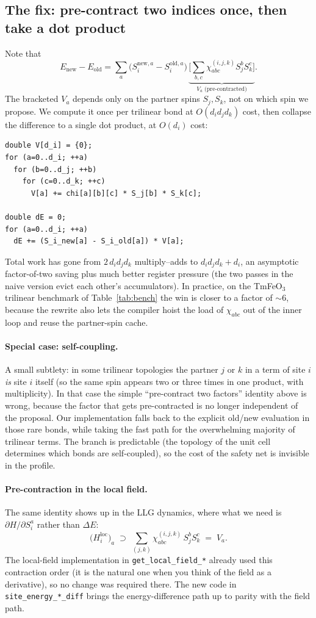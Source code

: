\documentclass[11pt,letterpaper]{article}
\begin{document}
\subsection{The fix: pre-contract two indices once, then take a dot product}
Note that
\[
   E_{\text{new}} - E_{\text{old}}
   = \sum_{a} \big(S_i^{\text{new}, a} - S_i^{\text{old}, a}\big) \,
     \underbrace{\Big[\sum_{b,c} \chi^{(i,j,k)}_{abc} S_j^{b} S_k^{c}\Big]}_{V_{a}\;\text{(pre-contracted)}} .
\]
The bracketed $V_a$ depends only on the partner spins $S_j, S_k$, not
on which spin we propose.  We compute it once per trilinear bond at
$O(d_i d_j d_k)$ cost, then collapse the difference to a single dot
product, at $O(d_i)$ cost:
\begin{lstlisting}
double V[d_i] = {0};
for (a=0..d_i; ++a)
  for (b=0..d_j; ++b)
    for (c=0..d_k; ++c)
      V[a] += chi[a][b][c] * S_j[b] * S_k[c];

double dE = 0;
for (a=0..d_i; ++a)
  dE += (S_i_new[a] - S_i_old[a]) * V[a];
\end{lstlisting}
Total work has gone from $2\,d_i d_j d_k$ multiply--adds to
$d_i d_j d_k + d_i$, an asymptotic factor-of-two saving plus much
better register pressure (the two passes in the naive version evict
each other's accumulators).  In practice, on the TmFeO$_3$ trilinear
benchmark of Table~\ref{tab:bench} the win is closer to a
factor of $\sim 6$, because the rewrite also lets the compiler hoist
the load of $\chi_{abc}$ out of the inner loop and reuse the
partner-spin cache.

\paragraph{Special case: self-coupling.}  A small subtlety: in some
trilinear topologies the partner $j$ or $k$ in a term of site $i$
\emph{is} site $i$ itself (so the same spin appears two or three times
in one product, with multiplicity).  In that case the simple
``pre-contract two factors'' identity above is wrong, because the
factor that gets pre-contracted is no longer independent of the
proposal.  Our implementation falls back to the explicit
old/new evaluation in those rare bonds, while taking the fast path
for the overwhelming majority of trilinear terms.  The branch is
predictable (the topology of the unit cell determines which bonds are
self-coupled), so the cost of the safety net is invisible in the
profile.

\paragraph{Pre-contraction in the local field.}  The same identity
shows up in the LLG dynamics, where what we need is
$\partial H / \partial S_i^{a}$ rather than $\Delta E$:
\[
   \big(H_i^{\text{loc}}\big)_a \;\supset\;
   \sum_{(j,k)} \chi^{(i,j,k)}_{abc}\, S_j^{b} S_k^{c} \;=\; V_a .
\]
The local-field implementation in \texttt{get\_local\_field\_*}
already used this contraction order (it is the natural one when you
think of the field as a derivative), so no change was required there.
The new code in \texttt{site\_energy\_*\_diff} brings the
energy-difference path up to parity with the field path.
\end{document}

